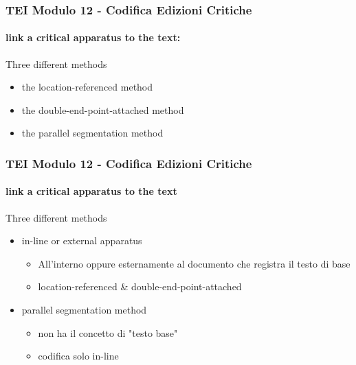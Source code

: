 \begin{frame}
    \frametitle{TEI Modulo 12 - Codifica Edizioni Critiche}
    \framesubtitle{link a critical apparatus to the text:}
    \addtocounter{nframe}{1}
    



    
    \begin{block}{Three different methods}
       \begin{itemize}
           \item the location-referenced method
           \item the double-end-point-attached method
           \item the parallel segmentation method
       \end{itemize}
     \end{block}


\end{frame}


\begin{frame}
    \frametitle{TEI Modulo 12 - Codifica Edizioni Critiche}
    \framesubtitle{link a critical apparatus to the text}
    \addtocounter{nframe}{1}
    
    \begin{block}{Three different methods}
       \begin{itemize}
           \item in-line or external apparatus
           \begin{itemize}
             \item All'interno oppure esternamente al documento che registra il testo di base
             \item location-referenced & double-end-point-attached
           \end{itemize}
           \item  parallel segmentation method
            \begin{itemize}
                \item non ha il concetto di "testo base"
                \item codifica solo in-line
            \end{itemize}
       \end{itemize}
     \end{block}

\end{frame}

